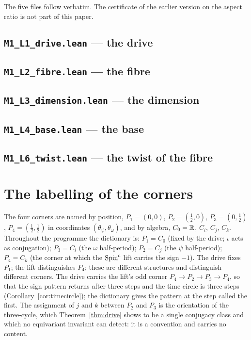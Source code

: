 \documentclass[11pt,a4paper]{article}
\theoremstyle{plain}
\theoremstyle{definition}
\theoremstyle{remark}
\begin{document}
The five files follow verbatim. The certificate of the earlier version on the aspect ratio is not part of this paper.

\subsection*{\texttt{M1\_L1\_drive.lean} --- the drive}


\subsection*{\texttt{M1\_L2\_fibre.lean} --- the fibre}


\subsection*{\texttt{M1\_L3\_dimension.lean} --- the dimension}


\subsection*{\texttt{M1\_L4\_base.lean} --- the base}


\subsection*{\texttt{M1\_L6\_twist.lean} --- the twist of the fibre}


\section{The labelling of the corners}\label{app:labels}

The four corners are named by position, $P_{1}=(0,0)$, $P_{2}=(\tfrac12,0)$, $P_{3}=(0,\tfrac12)$, $P_{4}=(\tfrac12,\tfrac12)$ in coordinates $(\theta_{\psi},\theta_{\omega})$, and by algebra, $C_{0}=\mathbb{R}$, $C_{i}$, $C_{j}$, $C_{k}$. Throughout the programme the dictionary is: $P_{1}=C_{0}$ (fixed by the drive; $\iota$ acts as conjugation); $P_{3}=C_{i}$ (the $\omega$ half-period); $P_{2}=C_{j}$ (the $\psi$ half-period); $P_{4}=C_{k}$ (the corner at which the $\text{Spin}^c$ lift carries the sign $-1$). The drive fixes $P_{1}$; the lift distinguishes $P_{4}$; these are different structures and distinguish different corners. The drive carries the lift's odd corner $P_{4}\to P_{2}\to P_{3}\to P_{4}$, so that the sign pattern returns after three steps and the time circle is three steps (Corollary~\ref{cor:timecircle}); the dictionary gives the pattern at the step called the first. The assignment of $j$ and $k$ between $P_{2}$ and $P_{3}$ is the orientation of the three-cycle, which Theorem~\ref{thm:drive} shows to be a single conjugacy class and which no equivariant invariant can detect: it is a convention and carries no content.
\end{document}
